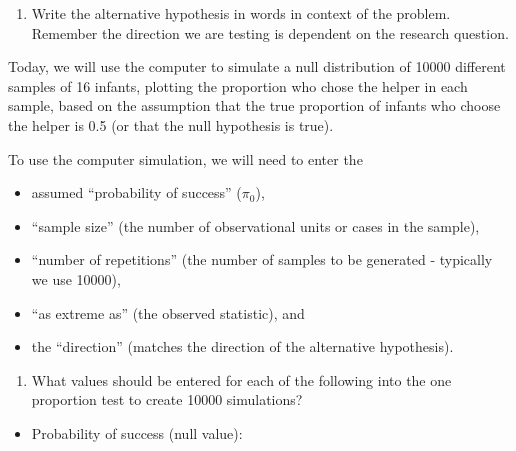 \documentclass[
]{report}
\providecommand{\tightlist}{%
  \setlength{\itemsep}{0pt}\setlength{\parskip}{0pt}}
\begin{document}
\vspace{0.3in}

\begin{enumerate}
\def\labelenumi{\arabic{enumi}.}
\setcounter{enumi}{1}
\tightlist
\item
  Write the alternative hypothesis in words in context of the problem. Remember the direction we are testing is dependent on the research question.
\end{enumerate}

\vspace{0.8in}

Today, we will use the computer to simulate a null distribution of 10000 different samples of 16 infants, plotting the proportion who chose the helper in each sample, based on the assumption that the true proportion of infants who choose the helper is 0.5 (or that the null hypothesis is true).

\newpage

To use the computer simulation, we will need to enter the

\begin{itemize}
\tightlist
\item
  assumed ``probability of success'' (\(\pi_0\)),
\item
  ``sample size'' (the number of observational units or cases in the sample),
\item
  ``number of repetitions'' (the number of samples to be generated - typically we use 10000),
\item
  ``as extreme as'' (the observed statistic), and
\item
  the ``direction'' (matches the direction of the alternative hypothesis).
\end{itemize}

\begin{enumerate}
\def\labelenumi{\arabic{enumi}.}
\setcounter{enumi}{2}
\tightlist
\item
  What values should be entered for each of the following into the one proportion test to create 10000 simulations?
\end{enumerate}

\vspace{1mm}

\begin{itemize}
\tightlist
\item
  Probability of success (null value):
\end{itemize}

\vspace{.2in}
\end{document}
